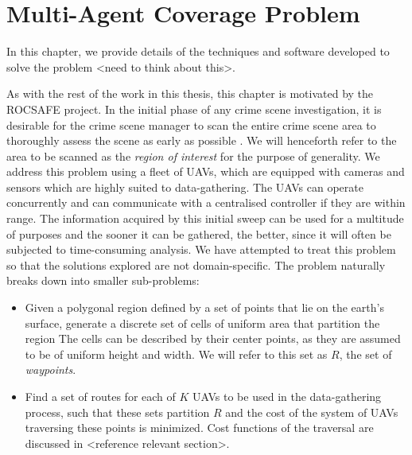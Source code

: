 \chapter{Multi-Agent Coverage Problem}
In this chapter, we provide details of the techniques and software developed to solve the problem <need to think about this>.

As with the rest of the work in this thesis, this chapter is motivated by the ROCSAFE project. In the initial phase of any crime scene investigation, it is desirable for the crime scene manager to scan the entire crime scene area to thoroughly assess the scene as early as possible \cite{TechnicalWorkingGrouponCrimeSceneInvestigation2013CrimeEnforcement}. We will henceforth refer to the area to be scanned as the \textit{region of interest} for the purpose of generality. We address this problem using a fleet of UAVs, which are equipped with cameras and sensors which are highly suited to data-gathering. The UAVs can operate concurrently and can communicate with a centralised controller if they are within range. The information acquired by this initial sweep can be used for a multitude of purposes and the sooner it can be gathered, the better, since it will often be subjected to time-consuming analysis. We have attempted to treat this problem so that the solutions explored are not domain-specific. The problem naturally breaks down into smaller sub-problems:
\begin{itemize}
    \item Given a polygonal region defined by a set of points that lie on the earth's surface, generate a discrete set of cells of uniform area that partition the region 
    The cells can be described by their center points, as they are assumed to be of uniform height and width. We will refer to this set as $R$, the set of \textit{waypoints}.
    \item Find a set of routes for each of $K$ UAVs to be used in the data-gathering process, such that these sets partition $R$ and the cost of the system of UAVs traversing these points is minimized. Cost functions of the traversal are discussed in <reference relevant section>.
\end{itemize}

